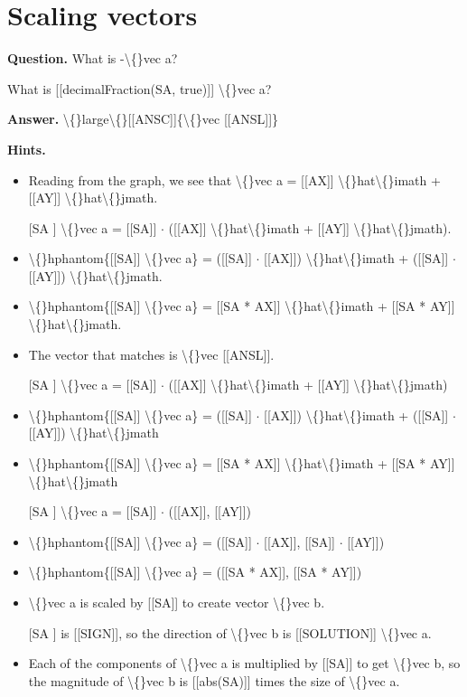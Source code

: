 \documentclass{article}
\begin{document}
\section*{Scaling vectors}
\textbf{Question.} What is -\textbackslash\{\}vec a?
                    
                        What is [[decimalFraction(SA, true)]] \textbackslash\{\}vec a?

\textbf{Answer.} \textbackslash\{\}large\textbackslash\{\}[[ANSC]]\{\textbackslash\{\}vec [[ANSL]]\}

\textbf{Hints.}
\begin{itemize}
  \item Reading from the graph, we see that \textbackslash\{\}vec a = [[AX]] \textbackslash\{\}hat\textbackslash\{\}imath + [[AY]] \textbackslash\{\}hat\textbackslash\{\}jmath.
  \item [[SA]] \textbackslash\{\}vec a = [[SA]] $\cdot$ ([[AX]] \textbackslash\{\}hat\textbackslash\{\}imath + [[AY]] \textbackslash\{\}hat\textbackslash\{\}jmath).
  \item \textbackslash\{\}hphantom\{[[SA]] \textbackslash\{\}vec a\} = ([[SA]] $\cdot$ [[AX]]) \textbackslash\{\}hat\textbackslash\{\}imath + ([[SA]] $\cdot$ [[AY]]) \textbackslash\{\}hat\textbackslash\{\}jmath.
  \item \textbackslash\{\}hphantom\{[[SA]] \textbackslash\{\}vec a\} = [[SA * AX]] \textbackslash\{\}hat\textbackslash\{\}imath + [[SA * AY]] \textbackslash\{\}hat\textbackslash\{\}jmath.
  \item The vector that matches is \textbackslash\{\}vec [[ANSL]].
  \item [[SA]] \textbackslash\{\}vec a = [[SA]] $\cdot$ ([[AX]] \textbackslash\{\}hat\textbackslash\{\}imath + [[AY]] \textbackslash\{\}hat\textbackslash\{\}jmath)
  \item \textbackslash\{\}hphantom\{[[SA]] \textbackslash\{\}vec a\} = ([[SA]] $\cdot$ [[AX]]) \textbackslash\{\}hat\textbackslash\{\}imath + ([[SA]] $\cdot$ [[AY]]) \textbackslash\{\}hat\textbackslash\{\}jmath
  \item \textbackslash\{\}hphantom\{[[SA]] \textbackslash\{\}vec a\} = [[SA * AX]] \textbackslash\{\}hat\textbackslash\{\}imath + [[SA * AY]] \textbackslash\{\}hat\textbackslash\{\}jmath
  \item [[SA]] \textbackslash\{\}vec a = [[SA]] $\cdot$ ([[AX]], [[AY]])
  \item \textbackslash\{\}hphantom\{[[SA]] \textbackslash\{\}vec a\} = ([[SA]] $\cdot$ [[AX]], [[SA]] $\cdot$ [[AY]])
  \item \textbackslash\{\}hphantom\{[[SA]] \textbackslash\{\}vec a\} = ([[SA * AX]], [[SA * AY]])
  \item \textbackslash\{\}vec a is scaled by [[SA]] to create vector \textbackslash\{\}vec b.
  \item [[SA]] is [[SIGN]], so the direction of \textbackslash\{\}vec b is [[SOLUTION]] \textbackslash\{\}vec a.
  \item Each of the components of \textbackslash\{\}vec a is multiplied by [[SA]] to get \textbackslash\{\}vec b,
                        so the magnitude of \textbackslash\{\}vec b is [[abs(SA)]] times the size of \textbackslash\{\}vec a.
\end{itemize}
\end{document}
